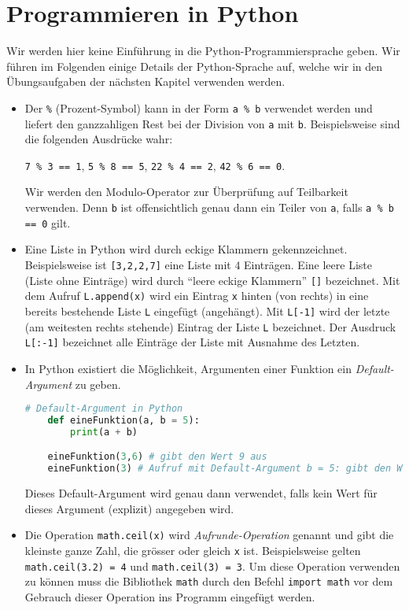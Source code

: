 \section{Programmieren in Python}
Wir werden hier keine Einführung in die Python-Programmiersprache geben. Wir führen im Folgenden einige Details der Python-Sprache auf, welche wir in den Übungsaufgaben der nächsten Kapitel verwenden werden.
\begin{itemize}
    \item Der  \verb|%| (Prozent-Symbol) kann in der Form \verb|a % b| verwendet werden und liefert den ganzzahligen Rest bei der Division von \verb|a| mit \verb|b|. Beispielsweise sind die folgenden Ausdrücke wahr:
    \begin{center}
        \verb|7 % 3 == 1|, \quad \verb|5 % 8 == 5|, \quad \verb|22 % 4 == 2|, \quad \verb|42 % 6 == 0|.
    \end{center}
    Wir werden den Modulo-Operator zur Überprüfung auf Teilbarkeit verwenden. Denn \verb|b| ist offensichtlich genau dann ein Teiler von \verb|a|, falls \verb|a % b == 0| gilt.
    \item Eine Liste in Python wird durch eckige Klammern gekennzeichnet. Beispielsweise ist \verb|[3,2,2,7]| eine Liste mit $4$ Einträgen. Eine leere Liste (Liste ohne Einträge) wird durch \enquote{leere eckige Klammern} \verb|[]| bezeichnet. Mit dem Aufruf \verb|L.append(x)| wird ein Eintrag \verb|x| hinten (von rechts) in eine bereits bestehende Liste \verb|L| eingefügt (angehängt). Mit \verb|L[-1]| wird der letzte (am weitesten rechts stehende) Eintrag der Liste \verb|L| bezeichnet. Der Ausdruck \verb|L[:-1]| bezeichnet alle Einträge der Liste mit Ausnahme des Letzten.
    \item In Python existiert die Möglichkeit, Argumenten einer Funktion ein \textit{Default-Argument} zu geben.
    \begin{lstlisting}[language=Python,caption=Default-Argument,numbers=none]
    # Default-Argument in Python
    def eineFunktion(a, b = 5):
        print(a + b)

    eineFunktion(3,6) # gibt den Wert 9 aus
    eineFunktion(3) # Aufruf mit Default-Argument b = 5: gibt den Wert 8 aus
    \end{lstlisting}
    Dieses Default-Argument wird genau dann verwendet, falls kein Wert für dieses Argument (explizit) angegeben wird.
    \item Die Operation \verb|math.ceil(x)| wird \textit{Aufrunde-Operation} genannt und gibt die kleinste ganze Zahl, die grösser oder gleich \verb|x| ist. Beispielsweise gelten \verb|math.ceil(3.2) = 4| und \verb|math.ceil(3) = 3|. Um diese Operation verwenden zu können muss die Bibliothek \verb|math| durch den Befehl \verb|import math| vor dem Gebrauch dieser Operation ins Programm eingefügt werden.
\end{itemize}
